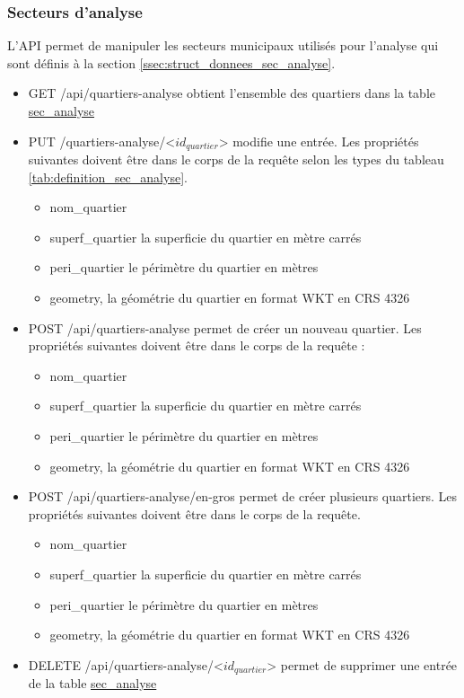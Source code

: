 \subsubsection{Secteurs d'analyse}
L'\ac{API} permet de manipuler les secteurs municipaux utilisés pour l'analyse qui sont définis à la section \ref{ssec:struct_donnees_sec_analyse}.
\begin{itemize}
    \item GET /api/quartiers-analyse obtient l'ensemble des quartiers dans la table \ul{sec\_analyse}
    \item PUT /quartiers-analyse/<$id_{quartier}$> modifie une entrée. Les propriétés suivantes doivent être dans le corps de la requête selon les types du tableau \ref{tab:definition_sec_analyse}.
        \begin{itemize}
            \item nom\_quartier
            \item superf\_quartier la superficie du quartier en mètre carrés
            \item peri\_quartier le périmètre du quartier en mètres
            \item geometry, la géométrie du quartier en format WKT en CRS 4326
        \end{itemize}
    \item POST /api/quartiers-analyse permet de créer un nouveau quartier. Les propriétés suivantes doivent être dans le corps de la requête :
        \begin{itemize}
            \item nom\_quartier
            \item superf\_quartier la superficie du quartier en mètre carrés
            \item peri\_quartier le périmètre du quartier en mètres
            \item geometry, la géométrie du quartier en format WKT en CRS 4326
        \end{itemize}
    \item POST /api/quartiers-analyse/en-gros permet de créer plusieurs quartiers. Les propriétés suivantes doivent être dans le corps de la requête.
        \begin{itemize}
            \item nom\_quartier
            \item superf\_quartier la superficie du quartier en mètre carrés
            \item peri\_quartier le périmètre du quartier en mètres
            \item geometry, la géométrie du quartier en format WKT en CRS 4326
        \end{itemize}
    \item DELETE /api/quartiers-analyse/<$id_{quartier}$> permet de supprimer une entrée de la table \ul{sec\_analyse}
\end{itemize}
